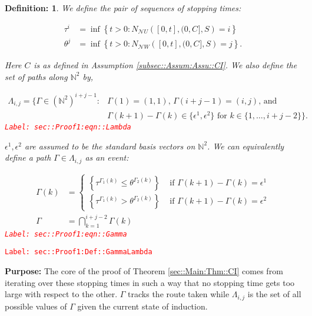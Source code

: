 \documentclass[12pt]{article}
\newcommand{\mb}{\mathbb}
\newcommand{\mc}{\mathcal}
\newcommand{\te}{\text}
\newcommand{\ep}{\epsilon}
\newcommand{\tr}{\textcolor{red}}
\newcommand{\labe}[1]{\tr{\texttt{Label: #1}}}
\newcommand{\purpose}{\textbf{Purpose: }}
\newcommand{\neigh}{\mc{N}}					%
\renewcommand{\U}{U}							%
\newcommand{\UU}{W}								%
\renewcommand{\S}{S}							%
\newcommand{\ev}[1]{\ep^{#1}}					%
\renewcommand{\t}{t}							%
\newcommand{\poiss}[1]{N_{#1}}						%
\newcommand{\rt}[1]{\tau^{#1}}						%
\newcommand{\rtt}[1]{\theta^{#1}}					%
\renewcommand{\it}{k}								%
\newcommand{\itt}{i}								%
\newcommand{\ittt}{j}								%
\newcommand{\const}[1]{C_{#1}}						%
\newcommand{\apath}{\Gamma}						%
\newcommand{\pathset}[2]{\Lambda_{#1,#2}}			%
\newtheorem{defn}[thms]{Definition: }
\begin{document}
\begin{defn}
We define the pair of sequences of stopping times:

\begin{align*}
\rt{\itt} &= \inf \left\{\t > 0: \poiss{\neigh{\U}}\left([0,\t],(0,\const{}],\S\right) = \itt\right\}\\
\rtt{\ittt} &= \inf \left\{\t > 0: \poiss{\neigh{\UU}}\left([0,\t],(0,\const{}],\S\right) = \ittt\right\}.
\end{align*}

Here \(\const{}\) is as defined in Assumption \ref{subsec::Assum:Assu::CI}. We also define the set of paths along \(\mb{N}^2\) by,

\begin{align}
\pathset{\itt}{\ittt} = \{\apath \in (\mb{N}^2)^{\itt+\ittt-1}: &\apath(1) = (1,1)\te{, } \apath(\itt+\ittt-1) = (\itt,\ittt)\te{, and } \nonumber\\
&\Gamma(\it+1) - \Gamma(\it)\in \{\ev{1},\ev{2}\}\te{ for }\it\in \{1,\dots, \itt+\ittt-2\}\}.
\label{sec::Proof1:eqn::Lambda}
\end{align}
\labe{sec::Proof1:eqn::Lambda}

\(\ev{1},\ev{2}\) are assumed to be the standard basis vectors on \(\mb{N}^2\). We can equivalently define a path \(\apath \in \pathset{\itt}{\ittt}\) as an event:

\begin{align}
\apath(\it) &= \begin{cases}
\left\{\rt{\apath_1(\it)} \leq \rtt{\apath_2(\it)}\right\} &\te{ if } \apath(\it+1) - \apath(\it) = \ev{1}\\
\left\{\rt{\apath_1(\it)} > \rtt{\apath_2(\it)}\right\} &\te{ if } \apath(\it+1) - \apath(\it) = \ev{2}
\end{cases}\\
\apath &= \bigcap_{\it=1}^{\itt+\ittt-2} \apath(\it)
\label{sec::Proof1:eqn::Gamma}
\end{align}
\labe{sec::Proof1:eqn::Gamma}
\label{sec::Proof1:Def::GammaLambda}
\end{defn}
\labe{sec::Proof1:Def::GammaLambda}

\purpose The core of the proof of Theorem \ref{sec::Main:Thm::CI} comes from iterating over these stopping times in such a way that no stopping time gets too large with respect to the other. \(\apath\) tracks the route taken while \(\pathset{\itt}{\ittt}\) is the set of all possible values of \(\apath\) given the current state of induction.
\end{document}

